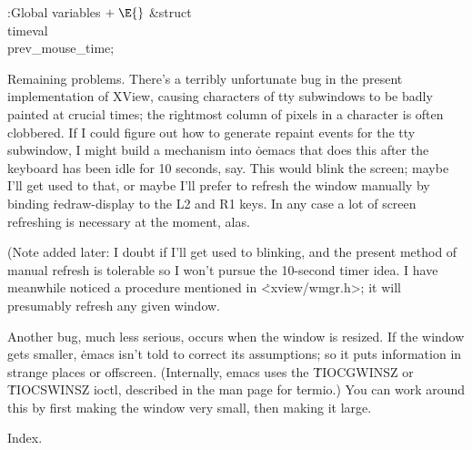 \B{}:Global variables\X${}\mathrel+\E{}$\6
\&{struct} \\{timeval} \\{prev\_mouse\_time};\par
\fi

Remaining problems. There's a terribly unfortunate bug in the
present implementation of XView, causing characters of tty subwindows
to be badly painted at crucial times; the rightmost column of pixels
in a character is often clobbered. If I could figure out how to
generate repaint events for the tty subwindow, I might build a mechanism
into \.{oemacs} that does this after the keyboard has been idle for 10
seconds, say.  This would blink the screen; maybe I'll get used to that,
or maybe I'll prefer to refresh the window manually by binding
\.{redraw-display} to the L2 and R1 keys.  In any case a lot of screen
refreshing is necessary at the moment, alas.

(Note added later: I doubt if I'll get used to blinking, and the present
method of manual refresh is tolerable so I won't pursue the 10-second
timer idea. I have meanwhile noticed a procedure 
mentioned in \.{<xview/wmgr.h>}; it will presumably refresh any
given window.

Another bug, much less serious, occurs when the window is resized.
If the window gets smaller, \.{emacs} isn't told to correct its
assumptions; so it puts information in strange places or offscreen.
(Internally, emacs uses the \.{TIOCGWINSZ} or \.{TIOCSWINSZ} ioctl,
described in the man page for \.{termio}.)
You can work around this by first making the window very small, then
making it large.

\fi

Index.


\fi


\inx
\fin
\con
